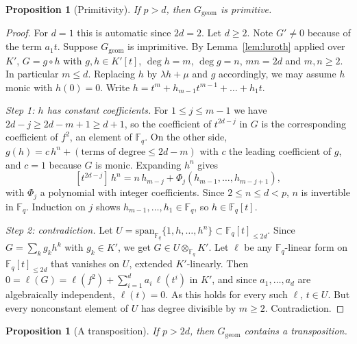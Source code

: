 \documentclass[11pt,a4paper]{article}
\newtheorem{proposition}[theorem]{Proposition}
\theoremstyle{definition}
\theoremstyle{remark}
\newcommand{\Fq}{\mathbb{F}_q}
\newcommand{\Ggeom}{G_{\mathrm{geom}}}
\begin{document}
\begin{proposition}[Primitivity]\label{prop:primitive}
If $p>d$, then $\Ggeom$ is primitive.
\end{proposition}

\begin{proof}
For $d=1$ this is automatic since $2d=2$. Let $d\ge2$. Note $G'\ne0$ because of the
term $a_1t$. Suppose $\Ggeom$ is imprimitive. By Lemma~\ref{lem:luroth} applied over
$K'$, $G=g\circ h$ with $g,h\in K'[t]$, $\deg h=m$, $\deg g=n$, $mn=2d$ and $m,n\ge2$.
In particular $m\le d$. Replacing $h$ by $\lambda h+\mu$ and $g$ accordingly, we may
assume $h$ monic with $h(0)=0$. Write $h=t^m+h_{m-1}t^{m-1}+\dots+h_1t$.

\emph{Step 1: $h$ has constant coefficients.}
For $1\le j\le m-1$ we have $2d-j\ge 2d-m+1\ge d+1$, so the coefficient of $t^{2d-j}$
in $G$ is the corresponding coefficient of $f^2$, an element of $\Fq$.
On the other side, $g(h)=c\,h^n+(\text{terms of degree}\le 2d-m)$ with $c$ the leading
coefficient of $g$, and $c=1$ because $G$ is monic. Expanding $h^n$ gives
\[
 [t^{2d-j}]\,h^n=n\,h_{m-j}+\Phi_j(h_{m-1},\dots,h_{m-j+1}),
\]
with $\Phi_j$ a polynomial with integer coefficients. Since $2\le n\le d<p$, $n$ is
invertible in $\Fq$. Induction on $j$ shows $h_{m-1},\dots,h_1\in\Fq$, so $h\in\Fq[t]$.

\emph{Step 2: contradiction.}
Let $U=\mathrm{span}_{\Fq}\{1,h,\dots,h^n\}\subset\Fq[t]_{\le2d}$. Since
$G=\sum_k g_kh^k$ with $g_k\in K'$, we get $G\in U\otimes_{\Fq}K'$.
Let $\ell$ be any $\Fq$-linear form on $\Fq[t]_{\le 2d}$ that vanishes on $U$,
extended $K'$-linearly. Then
$0=\ell(G)=\ell(f^2)+\sum_{i=1}^{d}a_i\,\ell(t^i)$ in $K'$, and since
$a_1,\dots,a_d$ are algebraically independent, $\ell(t)=0$.
As this holds for every such $\ell$, $t\in U$. But every nonconstant element of
$U$ has degree divisible by $m\ge2$. Contradiction.
\end{proof}

\begin{proposition}[A transposition]\label{prop:transposition}
If $p>2d$, then $\Ggeom$ contains a transposition.
\end{proposition}
\end{document}
